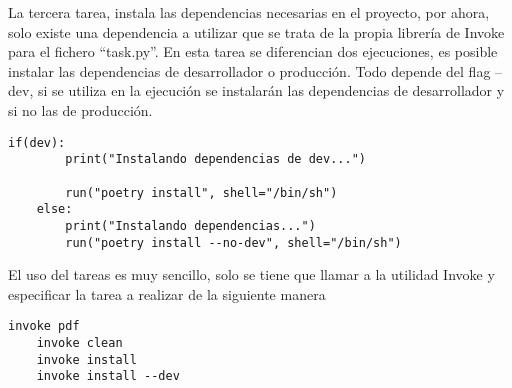La tercera tarea, instala las \glspl{dependencia} necesarias en el proyecto, por ahora, solo existe una \gls{dependencia} a utilizar que se trata de la propia librería de Invoke para el fichero ``task.py''. En esta tarea se diferencian dos ejecuciones, es posible instalar las \glspl{dependencia} de desarrollador o producción. Todo depende del \gls{flag} --dev, si se utiliza en la ejecución se instalarán las \glspl{dependencia} de desarrollador y si no las de producción. 
\begin{lstlisting}[style=consola]
	if(dev):
		print("Instalando dependencias de dev...")
		
		run("poetry install", shell="/bin/sh")
	else:
		print("Instalando dependencias...")
		run("poetry install --no-dev", shell="/bin/sh")
\end{lstlisting}
\newpage
El uso del \gls{tareas} es muy sencillo, solo se tiene que llamar a la utilidad Invoke y especificar la tarea a realizar de la siguiente manera
\begin{lstlisting}[style=consola]
	invoke pdf
	invoke clean
	invoke install
	invoke install --dev
\end{lstlisting}